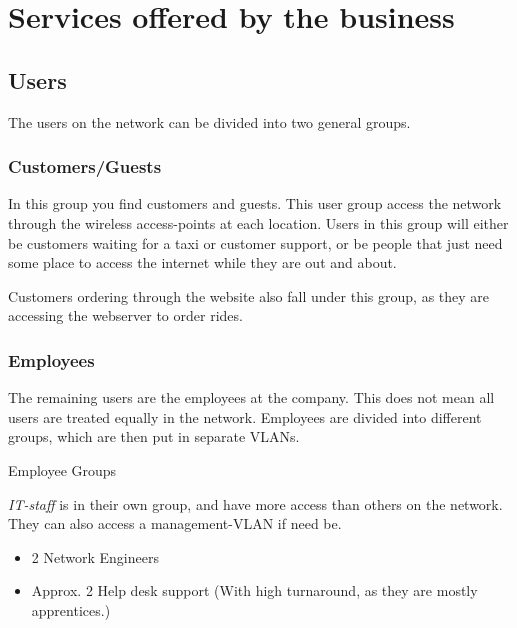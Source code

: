 \section{Services offered by the business}

\subsection{Users}
The users on the network can be divided into two general groups.

\subsubsection{Customers/Guests}
\vspace{-0.6em}
In this group you find customers and guests. 
This user group access the network through the wireless access-points at each location.
Users in this group will either be customers waiting for a taxi or customer support, or be people that just need some place to access the internet while they are out and about.

Customers ordering through the website also fall under this group, as they are accessing the webserver to order rides.

\subsubsection{Employees}
\vspace{-0.6em}
The remaining users are the employees at the company.
This does not mean all users are treated equally in the network. 
Employees are divided into different groups, which are then put in separate VLANs.

Employee Groups
\hfill

\emph{IT-staff} is in their own group, and have more access than others on the network.
They can also access a management-VLAN if need be.
\begin{itemize}[noitemsep]
    \item 2 Network Engineers
    \item Approx. 2 Help desk support (With high turnaround, as they are mostly apprentices.)

\end{itemize}

